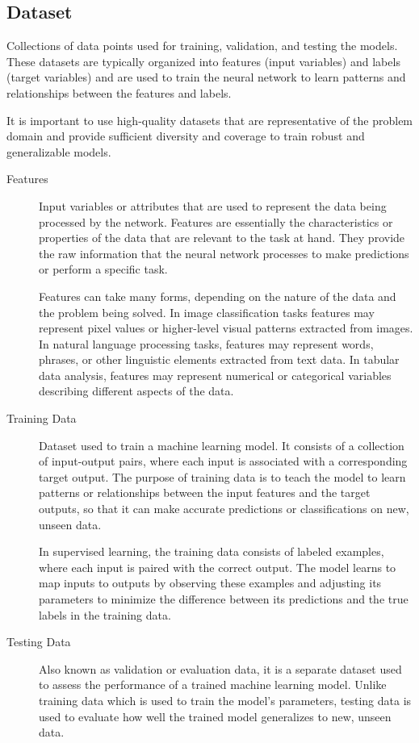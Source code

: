 \documentclass[a4paper]{report}
\begin{document}
\subsection*{Dataset}
Collections of data points used for training, validation, and testing the models. These datasets are typically organized into features (input variables) and labels (target variables) and are used to train the neural network to learn patterns and relationships between the features and labels.

It is important to use high-quality datasets that are representative of the problem domain and provide sufficient diversity and coverage to train robust and generalizable models.

\begin{description}
\item[Features]
Input variables or attributes that are used to represent the data being processed by the network. Features are essentially the characteristics or properties of the data that are relevant to the task at hand. They provide the raw information that the neural network processes to make predictions or perform a specific task.

Features can take many forms, depending on the nature of the data and the problem being solved. In image classification tasks features may represent pixel values or higher-level visual patterns extracted from images. In natural language processing tasks, features may represent words, phrases, or other linguistic elements extracted from text data. In tabular data analysis, features may represent numerical or categorical variables describing different aspects of the data.

\item[Training Data]
Dataset used to train a machine learning model. It consists of a collection of input-output pairs, where each input is associated with a corresponding target output. The purpose of training data is to teach the model to learn patterns or relationships between the input features and the target outputs, so that it can make accurate predictions or classifications on new, unseen data.

In supervised learning, the training data consists of labeled examples, where each input is paired with the correct output. The model learns to map inputs to outputs by observing these examples and adjusting its parameters to minimize the difference between its predictions and the true labels in the training data.

\item[Testing Data]
Also known as validation or evaluation data, it is a separate dataset used to assess the performance of a trained machine learning model. Unlike training data which is used to train the model's parameters, testing data is used to evaluate how well the trained model generalizes to new, unseen data. 


\end{description}
\end{document}
